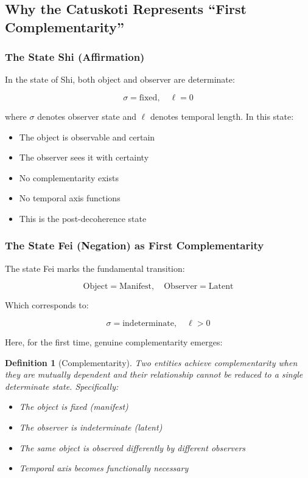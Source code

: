 \documentclass[12pt,a4paper]{article}
\newtheorem{definition}{Definition}[section]
\begin{document}
\subsection{Why the Catuskoti Represents ``First Complementarity''}

\subsubsection{The State Shi (Affirmation)}

In the state of Shi, both object and observer are determinate:

\begin{equation}
\sigma = \text{fixed}, \quad \ell = 0
\end{equation}

where $\sigma$ denotes observer state and $\ell$ denotes temporal length. In this state:
\begin{itemize}
    \item The object is observable and certain
    \item The observer sees it with certainty
    \item No complementarity exists
    \item No temporal axis functions
    \item This is the post-decoherence state
\end{itemize}

\subsubsection{The State Fei (Negation) as First Complementarity}

The state Fei marks the fundamental transition:

\begin{equation}
\text{Object} = \text{Manifest}, \quad \text{Observer} = \text{Latent}
\end{equation}

Which corresponds to:

\begin{equation}
\sigma = \text{indeterminate}, \quad \ell > 0
\end{equation}

Here, for the first time, genuine complementarity emerges:

\begin{definition}[Complementarity]
Two entities achieve complementarity when they are mutually dependent and their relationship cannot be reduced to a single determinate state. Specifically:
\begin{itemize}
    \item The object is fixed (manifest)
    \item The observer is indeterminate (latent)
    \item The same object is observed differently by different observers
    \item Temporal axis becomes functionally necessary
\end{itemize}
\end{definition}
\end{document}
